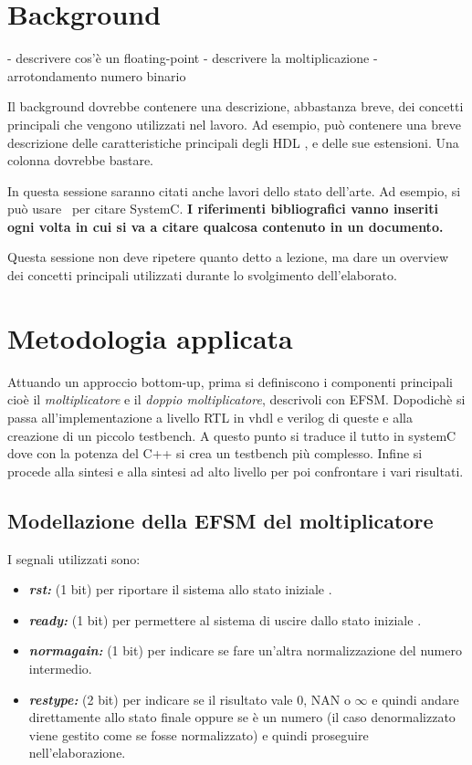 \documentclass[]{IEEEtran}
\begin{document}
\section{Background}

- descrivere cos'è un floating-point
- descrivere la moltiplicazione
- arrotondamento numero binario

Il background dovrebbe contenere una descrizione, abbastanza breve, dei concetti principali che vengono utilizzati nel lavoro. Ad esempio, può contenere una breve descrizione delle caratteristiche principali degli HDL , e delle sue estensioni. Una colonna dovrebbe bastare.

In questa sessione saranno citati anche lavori dello stato dell'arte. Ad esempio, si può usare~\cite{SystemC} per citare SystemC. \textbf{I riferimenti bibliografici vanno inseriti ogni volta in cui si va a citare qualcosa contenuto in un documento.}

Questa sessione non deve ripetere quanto detto a lezione, ma dare un overview dei concetti principali utilizzati durante lo svolgimento dell'elaborato.


\section{Metodologia applicata}
Attuando un approccio bottom-up, prima si definiscono i componenti principali cioè il {\it moltiplicatore} e il {\it doppio moltiplicatore}, descrivoli con EFSM. Dopodichè si passa all'implementazione a livello RTL in vhdl e verilog di queste e alla creazione di un piccolo testbench. A questo punto si traduce il tutto in systemC dove con la potenza del C++ si crea un testbench più complesso. Infine si procede alla sintesi e alla sintesi ad alto livello per poi confrontare i vari risultati.

\subsection{Modellazione della EFSM del moltiplicatore}
I segnali utilizzati sono:
\begin{itemize}
\item {\it\bf rst:} (1 bit) per riportare il sistema allo stato iniziale .
\item {\it\bf ready:} (1 bit) per permettere al sistema di uscire dallo stato iniziale .
\item {\it\bf norm\textunderscore again:} (1 bit) per indicare se fare un'altra normalizzazione del numero intermedio.
\item {\it\bf res\textunderscore type:} (2 bit) per indicare se il risultato vale 0, NAN o \(\infty\) e quindi andare direttamente allo stato finale oppure se è un numero (il caso denormalizzato viene gestito come se fosse normalizzato) e quindi proseguire nell'elaborazione.
\end{itemize}
\end{document}

